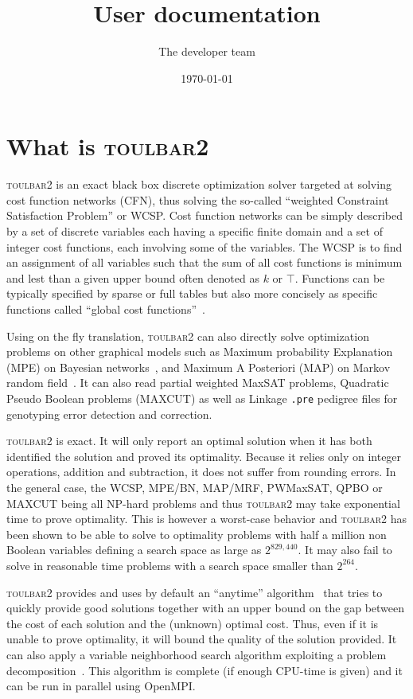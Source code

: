 \documentclass{article}
\title{\toulbar2 User documentation}
\author{The \toulbar2 developer team}
\date{\today}
\def\toulbar2{\textsc{toulbar2}}
\begin{document}
\maketitle
\section{What is \toulbar2}

\toulbar2 is an exact black box discrete optimization solver targeted
at solving cost function networks (CFN), thus solving the so-called
``weighted Constraint Satisfaction Problem'' or WCSP. Cost function
networks can be simply described by a set of discrete variables each
having a specific finite domain and a set of integer cost functions,
each involving some of the variables. The WCSP is to find an
assignment of all variables such that the sum of all cost functions is
minimum and lest than a given upper bound often denoted as $k$ or
$\top$. Functions can be typically specified by sparse or full tables
but also more concisely as specific functions called ``global cost
functions''~\cite{Schiex16a}.

Using on the fly translation, \toulbar2 can also directly solve
optimization problems on other graphical models such as Maximum
probability Explanation (MPE) on Bayesian networks~\cite{koller2009}, and
Maximum A Posteriori (MAP) on Markov random field~\cite{koller2009}. It can also
read partial weighted MaxSAT problems, Quadratic Pseudo Boolean
problems (MAXCUT) as well as Linkage \texttt{.pre} pedigree files for
genotyping error detection and correction.

\toulbar2 is exact. It will only report an optimal solution when it
has both identified the solution and proved its optimality. Because it
relies only on integer operations, addition and subtraction, it does
not suffer from rounding errors. In the general case, the WCSP,
MPE/BN, MAP/MRF, PWMaxSAT, QPBO or MAXCUT being all NP-hard problems
and thus \toulbar2 may take exponential time to prove optimality. This
is however a worst-case behavior and \toulbar2 has been shown to be
able to solve to optimality problems with half a million non Boolean
variables defining a search space as large as $2^{829,440}$. It may
also fail to solve in reasonable time problems with a search space
smaller than $2^{264}$.

\toulbar2 provides and uses by default an ``anytime''
algorithm~\cite{Katsirelos15a} that tries to quickly provide good solutions together
with an upper bound on the gap between the cost of each solution and
the (unknown) optimal cost. Thus, even if it is unable to prove
optimality, it will bound the quality of the solution provided.
It can also apply a variable neighborhood search algorithm exploiting a problem decomposition~\cite{Ouali17}.
This algorithm is complete (if enough CPU-time is given) and it can be run in parallel using OpenMPI.
\end{document}
